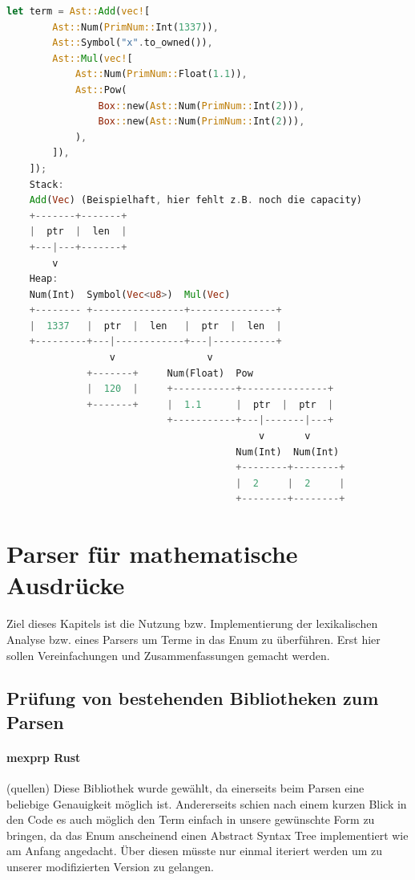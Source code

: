 \documentclass[11pt,a4paper, ngerman]{article}
\begin{document}
\begin{lstlisting}[language=rust, caption={Term 2 Stack und Heap}]
    let term = Ast::Add(vec![
        Ast::Num(PrimNum::Int(1337)),
        Ast::Symbol("x".to_owned()),
        Ast::Mul(vec![
            Ast::Num(PrimNum::Float(1.1)),
            Ast::Pow(
                Box::new(Ast::Num(PrimNum::Int(2))),
                Box::new(Ast::Num(PrimNum::Int(2))),
            ),
        ]),
    ]);
    Stack:
    Add(Vec) (Beispielhaft, hier fehlt z.B. noch die capacity)
    +-------+-------+
    |  ptr  |  len  |
    +---|---+-------+
        v
    Heap:
    Num(Int)  Symbol(Vec<u8>)  Mul(Vec)
    +-------- +----------------+---------------+
    |  1337   |  ptr  |  len   |  ptr  |  len  |
    +---------+---|------------+---|-----------+
                  v                v
              +-------+     Num(Float)  Pow
              |  120  |     +-----------+---------------+
              +-------+     |  1.1      |  ptr  |  ptr  |
                            +-----------+---|-------|---+
                                            v       v
                                        Num(Int)  Num(Int)
                                        +--------+--------+
                                        |  2     |  2     |
                                        +--------+--------+
\end{lstlisting}

\newpage

\section{Parser für mathematische Ausdrücke}
Ziel dieses Kapitels ist die Nutzung bzw. Implementierung der lexikalischen Analyse bzw. eines Parsers um Terme in das Enum  zu überführen. Erst hier sollen Vereinfachungen und Zusammenfassungen gemacht werden. 
\subsection{Prüfung von bestehenden Bibliotheken zum Parsen}
\paragraph{mexprp Rust} (quellen) Diese Bibliothek wurde gewählt, da einerseits beim Parsen eine beliebige Genauigkeit möglich ist. Andererseits schien nach einem kurzen Blick in den Code es auch möglich den Term einfach in unsere gewünschte Form zu bringen, da das Enum  anscheinend einen Abstract Syntax Tree implementiert wie am Anfang angedacht. Über diesen müsste nur einmal iteriert werden um zu unserer modifizierten Version zu gelangen.
\end{document}
